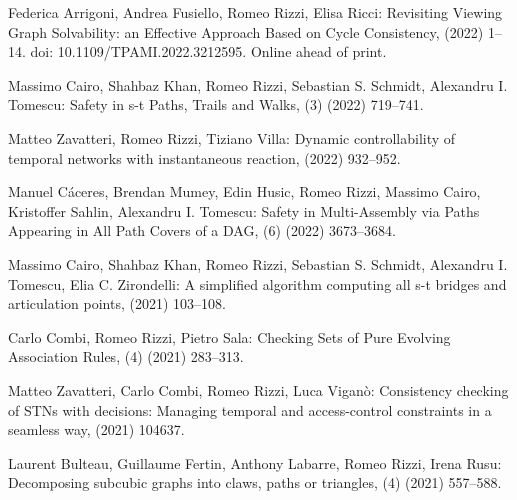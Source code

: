 \begin{etaremune}
  \item {\sc Federica Arrigoni, Andrea Fusiello, Romeo Rizzi, Elisa Ricci:}
   \newblock Revisiting Viewing Graph Solvability: an Effective Approach Based on Cycle Consistency,
   \newblock  (2022) 1--14.
   \newblock  doi: 10.1109/TPAMI.2022.3212595. Online ahead of print.

  \item {\sc Massimo Cairo, Shahbaz Khan, Romeo Rizzi, Sebastian S. Schmidt, Alexandru I. Tomescu:}
   \newblock Safety in s-t Paths, Trails and Walks,
   (3) (2022) 719--741.

  \item {\sc Matteo Zavatteri, Romeo Rizzi, Tiziano Villa:}
   \newblock Dynamic controllability of temporal networks with instantaneous reaction,
    (2022) 932--952.

  \item {\sc Manuel Cáceres, Brendan Mumey, Edin Husic, Romeo Rizzi, Massimo Cairo, Kristoffer Sahlin, Alexandru I. Tomescu:}
   \newblock Safety in Multi-Assembly via Paths Appearing in All Path Covers of a DAG,
   (6) (2022) 3673--3684.

  \item {\sc Massimo Cairo, Shahbaz Khan, Romeo Rizzi, Sebastian S. Schmidt, Alexandru I. Tomescu, Elia C. Zirondelli:}
   \newblock A simplified algorithm computing all s-t bridges and articulation points,
    (2021) 103--108.

  \item {\sc Carlo Combi, Romeo Rizzi, Pietro Sala:}
   \newblock Checking Sets of Pure Evolving Association Rules,
   (4) (2021) 283--313.

  \item {\sc Matteo Zavatteri, Carlo Combi, Romeo Rizzi, Luca Viganò:}
   \newblock Consistency checking of STNs with decisions: Managing temporal and access-control constraints in a seamless way,
    (2021) 104637.

  \item {\sc Laurent Bulteau, Guillaume Fertin, Anthony Labarre, Romeo Rizzi, Irena Rusu:}
   \newblock Decomposing subcubic graphs into claws, paths or triangles,
   (4) (2021) 557--588.


\end{etaremune}
